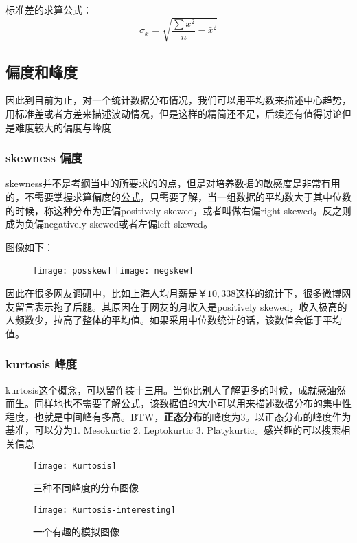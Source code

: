 标准差的求算公式：
\[
    \sigma_x= \sqrt {\frac{\sum x^2}{n} -\bar{x}^2}
\]


\subsection*{偏度和峰度}
因此到目前为止，对一个统计数据分布情况，我们可以用平均数来描述中心趋势，用标准差或者方差来描述波动情况，但是这样的精简还不足，后续还有值得讨论但是难度较大的偏度与峰度

\subsubsection*{skewness 偏度}
\gls{skewness}并不是考纲当中的所要求的的点，但是对培养数据的敏感度是非常有用的，不需要掌握求算偏度的\href{https://en.wikipedia.org/wiki/Skewness}{公式}，只需要了解，当一组数据的平均数大于其中位数的时候，称这种分布为正偏positively skewed，或者叫做右偏right skewed。反之则成为负偏negatively skewed或者左偏left skewed。

图像如下：
\begin{figure}[H]
\centering
\texttt{[image: posskew]}
\texttt{[image: negskew]}
\end{figure}

因此在很多网友调研中，比如上海人均月薪是$￥10,338$这样的统计下，很多微博网友留言表示拖了后腿。其原因在于网友的月收入是positively skewed，收入极高的人频数少，拉高了整体的平均值。如果采用中位数统计的话，该数值会低于平均值。

\subsubsection*{kurtosis 峰度}
\gls{kurtosis}这个概念，可以留作装十三用。当你比别人了解更多的时候，成就感油然而生。同样地也不需要了解\href{https://en.wikipedia.org/wiki/Kurtosis}{公式}，该数据值的大小可以用来描述数据分布的集中性程度，也就是中间峰有多高。BTW，\textbf{正态分布}的峰度为$3$。以正态分布的峰度作为基准，可以分为1. Mesokurtic 2. Leptokurtic 3. Platykurtic。感兴趣的可以搜索相关信息
\begin{figure}[H]
\centering
\texttt{[image: Kurtosis]}
\caption{三种不同峰度的分布图像}
\end{figure}

\begin{figure}[H]
\centering
\texttt{[image: Kurtosis-interesting]}
\caption{一个有趣的模拟图像}
\end{figure}
\clearpage


